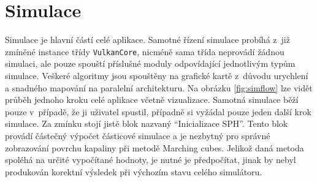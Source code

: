 \section{Simulace}
\label{chapter:simulace}
Simulace je hlavní částí celé aplikace. Samotné řízení simulace probíhá z~již zmíněné instance třídy \texttt{VulkanCore}, nicméně sama třída neprovádí žádnou simulaci, ale pouze spouští příslušné moduly odpovídající jednotlivým typům simulace. Veškeré algoritmy jsou spouštěny na grafické kartě z~důvodu urychlení a snadného mapování na paralelní architekturu. Na obrázku \ref{fig:simflow} lze vidět průběh jednoho kroku celé aplikace včetně vizualizace. Samotná simulace běží pouze v~případě, že ji uživatel spustil, případně si vyžádal pouze jeden další krok simulace. Za zmínku stojí jistě blok nazvaný \enquote{Inicializace SPH}. Tento blok provádí částečný výpočet částicové simulace a je nezbytný pro správné zobrazování povrchu kapaliny při metodě Marching cubes. Jelikož daná metoda spoléhá na určité vypočítané hodnoty, je nutné je předpočítat, jinak by nebyl produkován korektní výsledek při výchozím stavu celého simulátoru.

